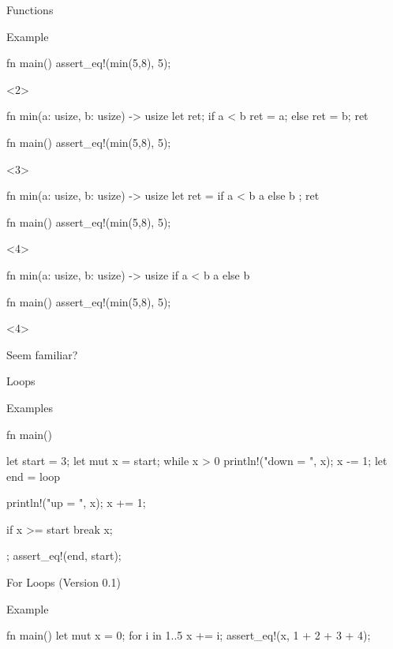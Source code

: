 \documentclass[8pt, aspectratio=169]{beamer}
\begin{document}
{\begin{frame}[fragile]{Functions}
\begin{exampleblock}{Example}
\begin{onlyenv}
\begin{rustcode}
fn main() {
    assert_eq!(min(5,8), 5);
}
\end{rustcode}
\end{onlyenv}
\begin{onlyenv}<2>
\begin{rustcode}
fn min(a: usize, b: usize) -> usize {
    let ret;
    if a < b {
        ret = a;
    } else {
        ret = b;
    }
    ret
}
 
fn main() {
    assert_eq!(min(5,8), 5);
}
\end{rustcode}
\end{onlyenv}
\begin{onlyenv}<3>
\begin{rustcode}
fn min(a: usize, b: usize) -> usize {
    let ret = if a < b { a } else { b };
    ret
}

fn main() {
    assert_eq!(min(5,8), 5);
}
\end{rustcode}
\end{onlyenv}
\begin{onlyenv}<4>
\begin{rustcode}
fn min(a: usize, b: usize) -> usize {
    if a < b { a } else { b }
}

fn main() {
    assert_eq!(min(5,8), 5);
}
\end{rustcode}
\end{onlyenv}
\end{exampleblock}
\begin{onlyenv}<4>
\begin{center}
Seem familiar?
\end{center}
\end{onlyenv}
\end{frame}

\begin{frame}[fragile]{Loops}
\begin{exampleblock}{Examples}
\begin{rustcode}
fn main() {
    let start = 3;
    let mut x = start;
    while x > 0 {
        println!("down = {}", x);
        x -= 1;
    }
    let end = loop {
        println!("up = {}", x);
        x += 1;
 
        if x >= start { break x; }
    };
    assert_eq!(end, start);
}
\end{rustcode}
\end{exampleblock}
\end{frame}

\begin{frame}[fragile]{For Loops (Version 0.1)}
\begin{exampleblock}{Example}
\begin{rustcode}
fn main() {
    let mut x = 0;
    for i in 1..5 {
        x += i;
    }
    assert_eq!(x, 1 + 2 + 3 + 4);
}
\end{rustcode}
\end{exampleblock}
\end{frame}

}
\end{document}
